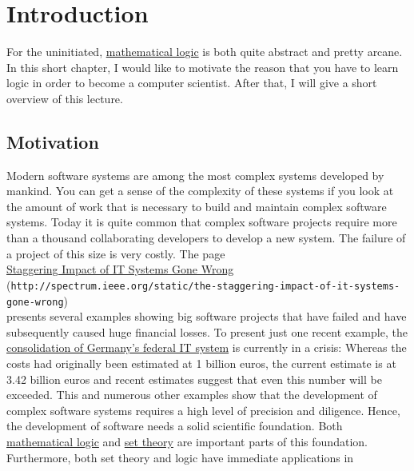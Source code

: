 \chapter{Introduction}
For the uninitiated, \href{https://en.wikipedia.org/wiki/Mathematical_logic}{mathematical logic} 
is both quite abstract and pretty arcane.  
In this short chapter, I would like to motivate the reason that you have to learn
logic in order to become a computer scientist.  After that, I will give a short overview of this
lecture.

\section{Motivation}
Modern software systems are among the most complex systems developed by mankind.  You can get a
sense of the complexity of these systems if you look at the amount of work that is necessary to
build and maintain complex software systems.  Today it is quite common that complex software projects require
more than a thousand collaborating developers to  
develop a new system.  The failure of a project of this size is very costly.
The page
\\[0.2cm]
\hspace*{0.8cm}
\href{http://spectrum.ieee.org/static/the-staggering-impact-of-it-systems-gone-wrong}{Staggering Impact of IT Systems Gone Wrong} 
\\[0.2cm]
\hspace*{0.8cm}
(\texttt{http://spectrum.ieee.org/static/the-staggering-impact-of-it-systems-gone-wrong})
\\[0.2cm]
presents several examples showing big software projects that have failed and have subsequently caused huge
financial losses.  To present just one recent example, the 
\href{https://www.tagesschau.de/inland/it-konsolidierung-bund-101.html}{consolidation of Germany's federal IT system} 
is currently in a crisis:  Whereas the costs had originally been estimated at 1 billion euros, the current
estimate is at 3.42 billion euros and recent estimates suggest that even this number will be exceeded.   
This and numerous other examples show that the development of complex software systems requires a high level
of precision and diligence.  Hence, the development of software needs a solid scientific
foundation.  Both \href{https://en.wikipedia.org/wiki/Mathematical_logic}{mathematical logic} and 
\href{https://en.wikipedia.org/wiki/Set_theory}{set theory}
are important parts of this foundation.  Furthermore, both set theory and logic have immediate applications in
